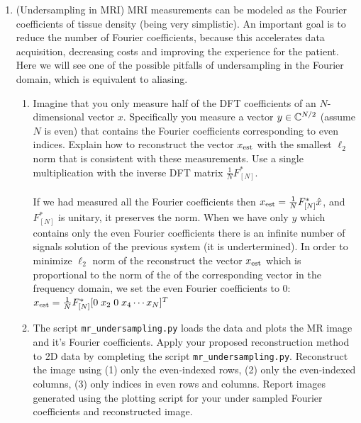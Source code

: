 \documentclass[12pt,twoside]{article}
\begin{document}
\begin{enumerate}
  \newpage
  \item (Undersampling in MRI) MRI measurements can be modeled as the Fourier coefficients of tissue density (being very simplistic). An important goal is to reduce the number of Fourier coefficients, because this accelerates data acquisition, decreasing costs and improving the experience for the patient. Here we will see one of the possible pitfalls of undersampling in the Fourier domain, which is equivalent to aliasing.
 \begin{enumerate}
 \item Imagine that you only measure half of the DFT coefficients of an $N$-dimensional vector $x$.  Specifically you measure a vector $y \in \mathbb{C}^{N/2}$ (assume $N$ is even) that contains the Fourier coefficients corresponding to even indices. Explain how to reconstruct the vector $x_{\operatorname{est}}$ with the smallest $\ell_2$ norm that is consistent with these measurements. Use a single multiplication with the inverse DFT matrix $\frac{1}{N}F_{[N]}^{\ast}$.\\ \\
 If we had measured all the  Fourier coefficients then $x_{\operatorname{est}} = \frac{1}{N}F_{[N]}^{\ast} \hat{x}$, and $F_{[N]}^{\ast}$ is unitary, it preserves the norm. When  we have only $y$ which contains only the even Fourier coefficients there is an infinite number of signals solution of the previous system (it is undertermined). In order to minimize  $\ell_2$ norm of the reconstruct the vector $x_{\operatorname{est}}$ which is proportional to the norm of the of the corresponding vector in the frequency domain, we set the even Fourier coefficients to $0$: $x_{\operatorname{est}} = \frac{1}{N}F_{[N]}^{\ast} [0 \; x_2 \;0 \; x_4 \cdots x_N]^T$
 
 \item The script  \texttt{mr\_undersampling.py} loads the data and plots the MR image and it's Fourier coefficients. Apply your proposed reconstruction method to 2D data by completing the script \texttt{mr\_undersampling.py}.  Reconstruct the image using (1) only the even-indexed rows, (2) only the even-indexed columns, (3) only indices in even rows and columns. Report images generated using the plotting script for your under sampled Fourier coefficients and reconstructed image.  


\end{enumerate}
\end{enumerate}
\end{document}
